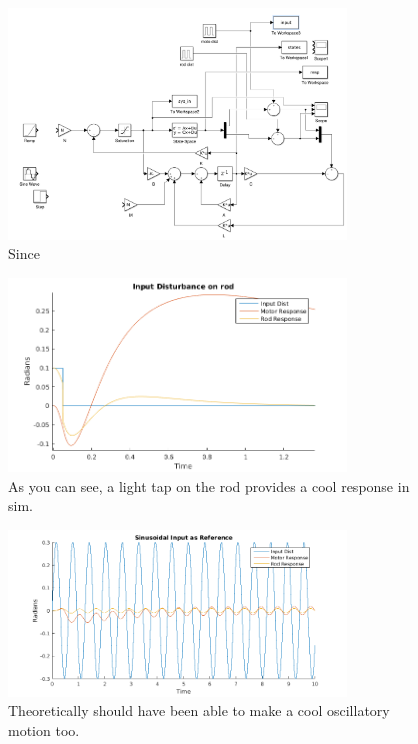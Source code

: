 \documentclass[12pt]{extarticle}
\newenvironment{sect}
  {\adjustwidth{-2.25em}{0pt}}
  {\endadjustwidth}
\begin{document}
\begin{sect}
\begin{figure}[H]
    \centering
    \includegraphics[width=0.8\textwidth]{Images/observer.png}
    \caption{Since}
\end{figure}
\begin{figure}[H]
    \centering
    \includegraphics[width=0.8\textwidth]{Images/input_dist.png}
    \caption{As you can see, a light tap on the rod provides a cool response in sim.}
\end{figure}
\begin{figure}[H]
    \centering
    \includegraphics[width=0.8\textwidth]{Images/sin_in.png}
    \caption{Theoretically should have been able to make a cool oscillatory motion too.}
\end{figure}
\begin{figure}[H]

\end{figure}
\end{sect}
\end{document}

